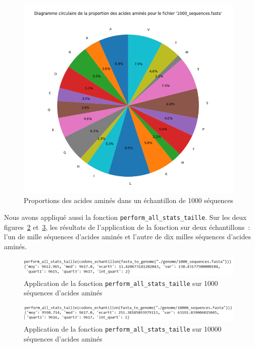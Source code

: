 \documentclass[12pt]{article}
\begin{document}
    \begin{figure}[!h]
        \centering
        \includegraphics[scale = 0.5]{Images/Stats/Codons/graphe_props_acide.png}
        \caption{Proportions des acides aminés dans un échantillon de 1000 séquences}     
        \label{graph:propac}
    \end{figure}

\newpage

Nous avons appliqué aussi la fonction \texttt{perform\_all\_stats\_taille}. Sur les deux figures~\ref{fig: appcodonstaille1000} et~\ref{fig: appcodonstaille10000}, les résultats de l'application de la fonction sur deux échantillons~: l'un de mille séquences d'acides aminés et l'autre de dix milles séquences d'acides aminés.\\

    \begin{figure}[!h]
        \centering
        \includegraphics[scale = 0.9]{Images/Codons/app_codons_taille1000.png}
        \caption{Application de la fonction \texttt{perform\_all\_stats\_taille} sur 1000 séquences d'acides aminés }
        \label{fig: appcodonstaille1000}
    \end{figure}


     \begin{figure}[!h]
        \centering
        \includegraphics[scale = 0.9]{Images/Codons/app_codons_taille10000.png}
        \caption{Application de la fonction \texttt{perform\_all\_stats\_taille} sur 10000 séquences d'acides aminés}
        \label{fig: appcodonstaille10000}
    \end{figure}
\end{document}
